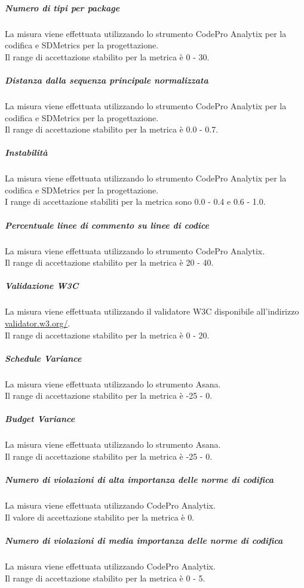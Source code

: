 			\subparagraph{Numero di tipi per package}
			La misura viene effettuata utilizzando lo strumento CodePro Analytix per la codifica e SDMetrics per la progettazione.
			\\Il range di accettazione stabilito per la metrica è 0 - 30.
			
			\subparagraph{Distanza dalla sequenza principale normalizzata}
			La misura viene effettuata utilizzando lo strumento CodePro Analytix per la codifica e SDMetrics per la progettazione.
			\\Il range di accettazione stabilito per la metrica è 0.0 - 0.7.
			
			\subparagraph{Instabilità}
			La misura viene effettuata utilizzando lo strumento CodePro Analytix per la codifica e SDMetrics per la progettazione.
			\\I range di accettazione stabiliti per la metrica sono 0.0 - 0.4 e 0.6 - 1.0.
			
			\subparagraph{Percentuale linee di commento su linee di codice}
			La misura viene effettuata utilizzando lo strumento CodePro Analytix.
			\\Il range di accettazione stabilito per la metrica è 20 - 40.
			
			\subparagraph{Validazione W3C}
			La misura viene effettuata utilizzando il validatore W3C disponibile all'indirizzo \url{validator.w3.org/}.
			\\Il range di accettazione stabilito per la metrica è 0 - 20.
			
			\subparagraph{Schedule Variance}
			La misura viene effettuata utilizzando lo strumento Asana.
			\\Il range di accettazione stabilito per la metrica è -25 - 0.
			
			\subparagraph{Budget Variance}
			La misura viene effettuata utilizzando lo strumento Asana.
			\\Il range di accettazione stabilito per la metrica è -25 - 0.
			
			\subparagraph{Numero di violazioni di alta importanza delle norme di codifica}
			La misura viene effettuata utilizzando CodePro Analytix.
			\\Il valore di accettazione stabilito per la metrica è 0.
			
			\subparagraph{Numero di violazioni di media importanza delle norme di codifica}
			La misura viene effettuata utilizzando CodePro Analytix.
			\\Il range di accettazione stabilito per la metrica è 0 - 5.
			
